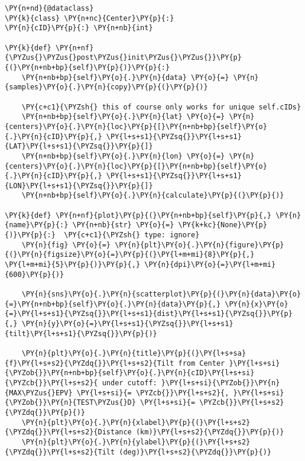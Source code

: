 \begin{tcolorbox}[breakable, size=fbox, boxrule=1pt, pad at break*=1mm,colback=cellbackground, colframe=cellborder]
\begin{Verbatim}[commandchars=\\\{\}]
\PY{n+nd}{@dataclass}
\PY{k}{class} \PY{n+nc}{Center}\PY{p}{:}
\PY{n}{cID}\PY{p}{:} \PY{n+nb}{int}

\PY{k}{def} \PY{n+nf}{\PYZus{}\PYZus{}post\PYZus{}init\PYZus{}\PYZus{}}\PY{p}{(}\PY{n+nb+bp}{self}\PY{p}{)}\PY{p}{:}
    \PY{n+nb+bp}{self}\PY{o}{.}\PY{n}{data} \PY{o}{=} \PY{n}{samples}\PY{o}{.}\PY{n}{copy}\PY{p}{(}\PY{p}{)}

    \PY{c+c1}{\PYZsh{} this of course only works for unique self.cIDs}
    \PY{n+nb+bp}{self}\PY{o}{.}\PY{n}{lat} \PY{o}{=} \PY{n}{centers}\PY{o}{.}\PY{n}{loc}\PY{p}{[}\PY{n+nb+bp}{self}\PY{o}{.}\PY{n}{cID}\PY{p}{,} \PY{l+s+s1}{\PYZsq{}}\PY{l+s+s1}{LAT}\PY{l+s+s1}{\PYZsq{}}\PY{p}{]}
    \PY{n+nb+bp}{self}\PY{o}{.}\PY{n}{lon} \PY{o}{=} \PY{n}{centers}\PY{o}{.}\PY{n}{loc}\PY{p}{[}\PY{n+nb+bp}{self}\PY{o}{.}\PY{n}{cID}\PY{p}{,} \PY{l+s+s1}{\PYZsq{}}\PY{l+s+s1}{LON}\PY{l+s+s1}{\PYZsq{}}\PY{p}{]}
    \PY{n+nb+bp}{self}\PY{o}{.}\PY{n}{calculate}\PY{p}{(}\PY{p}{)}

\PY{k}{def} \PY{n+nf}{plot}\PY{p}{(}\PY{n+nb+bp}{self}\PY{p}{,} \PY{n}{name}\PY{p}{:} \PY{n+nb}{str} \PY{o}{=} \PY{k+kc}{None}\PY{p}{)}\PY{p}{:}  \PY{c+c1}{\PYZsh{} type: ignore}
    \PY{n}{fig} \PY{o}{=} \PY{n}{plt}\PY{o}{.}\PY{n}{figure}\PY{p}{(}\PY{n}{figsize}\PY{o}{=}\PY{p}{(}\PY{l+m+mi}{8}\PY{p}{,} \PY{l+m+mi}{5}\PY{p}{)}\PY{p}{,} \PY{n}{dpi}\PY{o}{=}\PY{l+m+mi}{600}\PY{p}{)}

    \PY{n}{sns}\PY{o}{.}\PY{n}{scatterplot}\PY{p}{(}\PY{n}{data}\PY{o}{=}\PY{n+nb+bp}{self}\PY{o}{.}\PY{n}{data}\PY{p}{,} \PY{n}{x}\PY{o}{=}\PY{l+s+s1}{\PYZsq{}}\PY{l+s+s1}{dist}\PY{l+s+s1}{\PYZsq{}}\PY{p}{,} \PY{n}{y}\PY{o}{=}\PY{l+s+s1}{\PYZsq{}}\PY{l+s+s1}{tilt}\PY{l+s+s1}{\PYZsq{}}\PY{p}{)}

    \PY{n}{plt}\PY{o}{.}\PY{n}{title}\PY{p}{(}\PY{l+s+sa}{f}\PY{l+s+s2}{\PYZdq{}}\PY{l+s+s2}{Tilt from Center }\PY{l+s+si}{\PYZob{}}\PY{n+nb+bp}{self}\PY{o}{.}\PY{n}{cID}\PY{l+s+si}{\PYZcb{}}\PY{l+s+s2}{ under cutoff: }\PY{l+s+si}{\PYZob{}}\PY{n}{MAX\PYZus{}EPV} \PY{l+s+si}{= \PYZcb{}}\PY{l+s+s2}{, }\PY{l+s+si}{\PYZob{}}\PY{n}{TEST\PYZus{}D} \PY{l+s+si}{= \PYZcb{}}\PY{l+s+s2}{\PYZdq{}}\PY{p}{)}
    \PY{n}{plt}\PY{o}{.}\PY{n}{xlabel}\PY{p}{(}\PY{l+s+s2}{\PYZdq{}}\PY{l+s+s2}{Distance (km)}\PY{l+s+s2}{\PYZdq{}}\PY{p}{)}
    \PY{n}{plt}\PY{o}{.}\PY{n}{ylabel}\PY{p}{(}\PY{l+s+s2}{\PYZdq{}}\PY{l+s+s2}{Tilt (deg)}\PY{l+s+s2}{\PYZdq{}}\PY{p}{)}


\end{Verbatim}
\end{tcolorbox}
